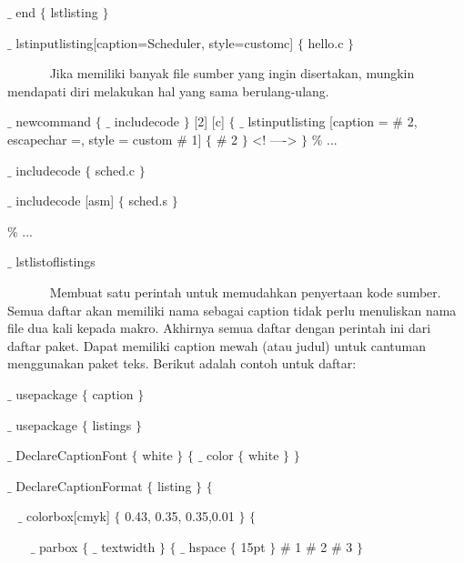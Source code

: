 {\fontsize{10pt}{10pt}\selectfont  $ \_ $ end $ \{ $ lstlisting $ \} $ }\par

{\fontsize{10pt}{10pt}\selectfont  $ \_ $ lstinputlisting[caption=Scheduler, style=customc] $ \{ $ hello.c $ \} $ }\par

\vspace{12pt}
\noindent ~~~~~~ Jika memiliki banyak file sumber yang ingin disertakan, mungkin mendapati diri melakukan hal yang sama berulang-ulang. 

$ \_ $  newcommand  $ \{ $  $ \_ $  includecode $ \} $  [2] [c]  $ \{ $  $ \_ $  lstinputlisting [caption =  $\#$  2, escapechar =, style = custom  $\#$  1]  $ \{ $  $\#$  2 $ \} $  <! ----> $ \} $  $\%$  ... 

$ \_ $  includecode  $ \{ $ sched.c $ \} $ 

$ \_ $  includecode [asm]  $ \{ $ sched.s $ \} $ 

$\%$  ... 

$ \_ $  lstlistoflistings

\vspace{12pt}
~~~~~~ Membuat satu perintah untuk memudahkan penyertaan kode sumber. Semua daftar akan memiliki nama  sebagai caption tidak perlu menuliskan nama file dua kali kepada makro. Akhirnya semua daftar dengan perintah ini dari daftar paket. Dapat memiliki caption mewah (atau judul) untuk cantuman menggunakan paket teks. Berikut adalah contoh untuk daftar:\par

{\fontsize{10pt}{10pt}\selectfont  $ \_ $ usepackage $ \{ $ caption $ \} $ }\par

{\fontsize{10pt}{10pt}\selectfont  $ \_ $ usepackage $ \{ $ listings $ \} $ }\par

{\fontsize{10pt}{10pt}\selectfont  $ \_ $ DeclareCaptionFont $ \{ $ white $ \} $  $ \{ $   $ \_ $ color $ \{ $ white $ \} $   $ \} $ }\par

{\fontsize{10pt}{10pt}\selectfont  $ \_ $ DeclareCaptionFormat $ \{ $ listing $ \} $  $ \{ $ }\par

{\fontsize{10pt}{10pt}\selectfont ~  $ \_ $ colorbox[cmyk] $ \{ $ 0.43, 0.35, 0.35,0.01  $ \} $  $ \{ $ }\par

{\fontsize{10pt}{10pt}\selectfont ~~~  $ \_ $ parbox $ \{ $  $ \_ $ textwidth $ \} $  $ \{ $  $ \_ $ hspace $ \{ $ 15pt $ \} $  $\#$ 1 $\#$ 2 $\#$ 3 $ \} $ }\par

